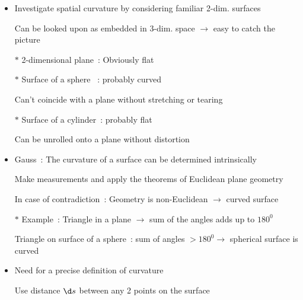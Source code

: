 \onecolumn
\begin{itemize}
\item Investigate spatial curvature by considering familiar 2-dim. surfaces
\item[] Can be looked upon as embedded in 3-dim. space $\rightarrow$ easy to catch the picture
\item[$\ast$] 2-dimensional plane~: Obviously flat
\item[$\ast$] Surface of a sphere ~: probably curved
\item[] Can't coincide with a plane without stretching or tearing
\item[$\ast$] Surface of a cylinder~: probably flat
\item[] Can be unrolled onto a plane without distortion
\item {\blue Gauss~: The curvature of a surface can be determined intrinsically}
\item[] Make measurements and apply the theorems of Euclidean plane geometry
\item[] In case of contradiction~: Geometry is non-Euclidean $\rightarrow$ curved surface
\item[$\ast$] Example~: Triangle in a plane $\rightarrow$ sum of the angles adds up to $180^{0}$
\item[] Triangle on surface of a sphere~: sum of angles $>180^{0} \rightarrow$ spherical surface is curved
\item {\blue Need for a precise definition of curvature}
\item[] {\red Use distance $\d s$ between any 2 points on the surface}
\end{itemize}

